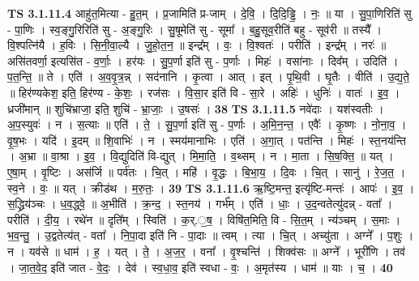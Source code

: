 \documentclass[17pt]{extarticle}
\begin{document}
                  \newline
                                \textbf{ TS 3.1.11.4} \newline
                  आहु॑त॒मित्या - हु॒त॒म् । प्र॒जामिति॑ प्र-जाम् । दे॒वि॒ । दि॒दि॒ड्ढि॒ । नः॒ ॥ या । सु॒पा॒णिरिति॑ सु - पा॒णिः । स्व॒ङ्गु॒रिरिति॑ सु - अ॒ङ्गु॒रिः । सु॒षूमेति॑ सु - सूमा᳚ । ब॒हु॒सूव॒रीति॑ बहु - सूव॑री ॥ तस्यै᳚ । वि॒श्पत्नि॑यै । ह॒विः । सि॒नी॒वा॒ल्यै । जु॒हो॒त॒न॒ ॥ इन्द्र᳚म् । वः॒ । वि॒श्वतः॑ । परीति॑ । इन्द्र᳚म् । नरः॑ ॥ असि॑तवर्णा॒ इत्यसि॑त - व॒र्णाः॒ । हर॑यः । सु॒प॒र्णा इति॑ सु - प॒र्णाः । मिहः॑ । वसा॑नाः । दिव᳚म् । उदिति॑ । प॒त॒न्ति॒ ॥ ते । एति॑ । अ॒व॒वृ॒त्र॒न्न् । सद॑नानि । कृ॒त्वा । आत् । इत् । पृ॒थि॒वी । घृ॒तैः । वीति॑ । उ॒द्य॒ते॒ ॥ हिर॑ण्यकेश॒ इति॒ हिर॑ण्य - के॒शः॒ । रज॑सः । वि॒सा॒र इति॑ वि - सा॒रे । अहिः॑ । धुनिः॑ । वातः॑ । इ॒व॒ । ध्रजी॑मान् ॥ शुचि॑भ्राजा॒ इति॒ शुचि॑ - भ्रा॒जाः॒ । उ॒षसः॑ । \textbf{  38} \newline
                  \newline
                                \textbf{ TS 3.1.11.5} \newline
                  नवे॑दाः । यश॑स्वतीः । अ॒प॒स्युवः॑ । न । स॒त्याः ॥ एति॑ । ते॒ । सु॒प॒र्णा इति॑ सु - प॒र्णाः । अ॒मि॒न॒न्त॒ । एवैः᳚ । कृ॒ष्णः । नो॒ना॒व॒ । वृ॒ष॒भः । यदि॑ । इ॒दम् ॥ शि॒वाभिः॑ । न । स्मय॑मानाभिः । एति॑ । अ॒गा॒त् । पत॑न्ति । मिहः॑ । स्त॒नय॑न्ति । अ॒भ्रा ॥ वा॒श्रा । इ॒व॒ । वि॒द्युदिति॑ वि-द्युत् । मि॒मा॒ति॒ । व॒थ्सम् । न । मा॒ता । सि॒ष॒क्ति॒ ॥ यत् । ए॒षा॒म् । वृ॒ष्टिः । अस॑र्जि ॥ पर्व॑तः । चि॒त् । महि॑ । वृ॒द्धः । बि॒भा॒य॒ । दि॒वः । चि॒त् । सानु॑ । रे॒ज॒त॒ । स्व॒ने । वः॒ ॥ यत् । क्रीड॑थ । म॒रु॒तः॒ । \textbf{  39} \newline
                  \newline
                                \textbf{ TS 3.1.11.6} \newline
                  ऋ॒ष्टि॒मन्त॒ इत्यृ॑ष्टि-मन्तः॑ । आपः॑ । इ॒व॒ । स॒द्ध्रिय॑ञ्चः । ध॒व॒द्ध्वे॒ ॥ अ॒भीति॑ । क्र॒न्द॒ । स्त॒नय॑ । गर्भ᳚म् । एति॑ । धाः॒ । उ॒द॒न्वतेत्यु॑दन्न् - वता᳚ । परीति॑ । दी॒य॒ । रथे॑न ॥ दृति᳚म् । स्विति॑ । क॒र्.॒ष॒ । विषि॑त॒मिति॒ वि - सि॒त॒म् । न्य॑ञ्चम् । स॒माः । भ॒व॒न्तु॒ । उ॒द्वतेत्य॑त् - वता᳚ । नि॒पा॒दा इति॑ नि - पा॒दाः ॥ त्वम् । त्या । चि॒त् । अच्यु॑ता । अग्ने᳚ । प॒शुः । न । यव॑से ॥ धाम॑ । ह॒ । यत् । ते॒ । अ॒ज॒र॒ । वना᳚ । वृ॒श्चन्ति॑ । शिक्व॑सः ॥ अग्ने᳚ । भूरी॑णि । तव॑ । जा॒त॒वे॒द॒ इति॑ जात - वे॒दः॒ । देव॑ । स्व॒धा॒व॒ इति॑ स्वधा - वः॒ । अ॒मृत॑स्य । धाम॑ ॥ याः । च॒ । \textbf{  40} \newline
                  \newline
\end{document}
